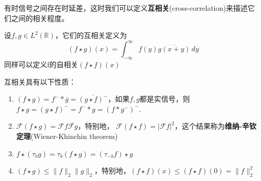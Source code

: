\documentclass{ctexbook}
\begin{document}
有时信号之间存在时延差，这时我们可以定义\textbf{互相关}(cross-correlation)来描述它
们之间的相关程度。
\begin{definition}[互相关]
设$f,g\in L^2(\mathbb{R})$，它们的互相关定义为
\begin{equation}
    (f\star g)(x)=\int_{-\infty}^{\infty}f(y)\overline{g(x+y)}\,dy
\end{equation}
同样可以定义f的自相关$(f\star f)(x)$
\end{definition}
互相关具有以下性质：
\begin{proposition}[互相关的性质]
\begin{enumerate}
    \quad
    \item $(f\star g) =f^-* \overline{g}=\overline{(g\star f)^-}$，如果$f,g$都是实信号，则$f\star g = (g\star f)^- =f^- *g=(f*g^-)^-$.
    \item $\mathcal{F} (f\star g) =\mathcal{F} f\overline{\mathcal{F} g}$，特别地，
          $\mathcal{F} (f\star f) =|\mathcal{F} f|^2$，这个结果称为\textbf{维纳-辛钦定理}(Wiener-Khinchin theorem)
    \item $f\star (\tau_b g)=\tau_{b} (f\star g)=(\tau_{-b}f)\star g$
    \item $(f\star g)\leq\|f\|_2\|g\|_2$，特别地，$(f\star f)(x)\leq (f\star f)(0)=\|f\|_2^2$
\end{enumerate}
\end{proposition}
\end{document}
